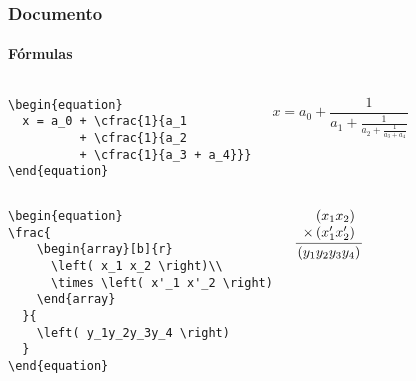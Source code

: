 \begin{frame}[fragile]
\frametitle{Documento}
\framesubtitle{Fórmulas}
  \scriptsize
  \begin{columns}[c]
  \begin{verbatim}
\begin{equation}
  x = a_0 + \cfrac{1}{a_1
          + \cfrac{1}{a_2
          + \cfrac{1}{a_3 + a_4}}}
\end{equation}
  \end{verbatim}
  \begin{fmpage}{\textwidth}
\begin{equation}
  x = a_0 + \frac{1}{a_1 + \frac{1}{a_2 + \frac{1}{a_3 + a_4}}}
\end{equation}
  \end{fmpage}
  \end{columns}


  \begin{columns}[c]
  \begin{verbatim}
\begin{equation}
\frac{
    \begin{array}[b]{r}
      \left( x_1 x_2 \right)\\
      \times \left( x'_1 x'_2 \right)
    \end{array}
  }{
    \left( y_1y_2y_3y_4 \right)
  }
\end{equation}
  \end{verbatim}
  \begin{fmpage}{\textwidth}
\begin{equation}
\frac{
    \begin{array}[b]{r}
      \left( x_1 x_2 \right)\\
      \times \left( x'_1 x'_2 \right)
    \end{array}
  }{
    \left( y_1y_2y_3y_4 \right)
  }
\end{equation}
  \end{fmpage}
  \end{columns}
\end{frame}


